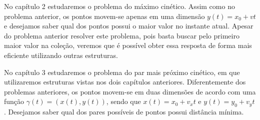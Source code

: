 No capítulo 2 estudaremos o problema do máximo cinético. Assim como no problema
anterior, os pontos movem-se apenas em uma dimensão $y(t) = x_0 + vt$ e
desejamos saber qual dos pontos possui o maior valor no instante atual. Apesar
do problema anterior resolver este problema, pois basta buscar pelo primeiro
maior valor na coleção, veremos que é possível obter essa resposta de forma mais
eficiente utilizando outras estruturas.

No capítulo 3 estudaremos o problema do par mais próximo cinético, em que
utilizaremos estruturas vistas nos dois capítulos anteriores. Diferentemente dos
problemas anteriores, os pontos movem-se em duas dimensões de acordo com uma
função $\gamma(t) = (x(t), y(t))$, sendo que $x(t) = x_0 + v_xt$ e $y(t) = y_0 +
v_yt$. Desejamos saber qual dos pares possíveis de pontos possui distância mínima.


